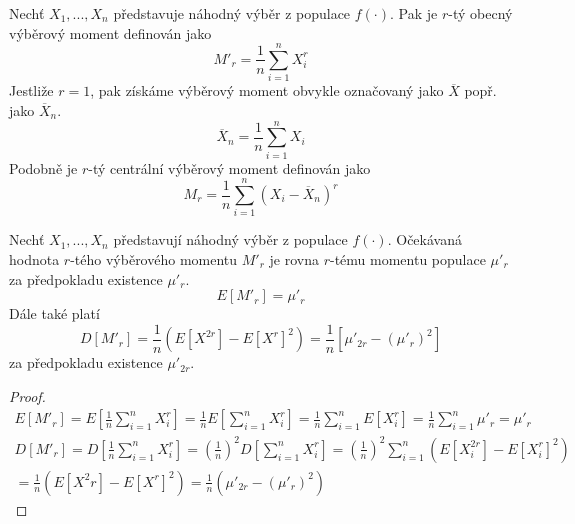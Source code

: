 \begin{definition}
Nechť $X_1, ..., X_n$ představuje náhodný výběr z populace $f(\cdot)$. Pak je $r$-tý obecný výběrový moment definován jako
\begin{equation*}
M'_r = \frac{1}{n} \sum_{i = 1}^n X_i^r
\end{equation*}
Jestliže $r = 1$, pak získáme výběrový moment obvykle označovaný jako $\overline{X}$ popř. jako $\overline{X}_n$.
\begin{equation*}
\overline{X}_n = \frac{1}{n} \sum_{i = 1}^n X_i
\end{equation*}
Podobně je $r$-tý centrální výběrový moment definován jako
\begin{equation*}
M_r = \frac{1}{n} \sum_{i = 1}^n \left(X_i - \overline{X}_n \right)^r
\end{equation*}
\end{definition}

\begin{theorem}
Nechť $X_1, ..., X_n$ představují náhodný výběr z populace $f(\cdot)$. Očekávaná hodnota $r$-tého výběrového momentu $M'_r$ je rovna $r$-tému momentu populace $\mu'_r$ za předpokladu existence $\mu'_r$. 
\begin{equation*}
E[M'_r] = \mu'_r
\end{equation*}
Dále také platí
\begin{equation*}
D[M'_r] = \frac{1}{n}\left(E[X^{2r}] - E[X^r]^2 \right) = \frac{1}{n} [\mu'_{2r} - (\mu'_r)^2]
\end{equation*}
za předpokladu existence $\mu'_{2r}$.
\end{theorem}

\begin{proof}
\begin{gather*}
E[M'_r] = E \left[\frac{1}{n} \sum_{i = 1}^n X_i^r \right] = \frac{1}{n} E \left[\sum_{i = 1}^n X_i^r \right] = \frac{1}{n} \sum_{i = 1}^n E[X_i^r] = \frac{1}{n} \sum_{i = 1}^n \mu'_r = \mu'_r
\end{gather*}
\begin{gather*}
D[M'_r] = D\left[\frac{1}{n} \sum_{i = 1}^n X_i^r \right] = \left(\frac{1}{n} \right)^2 D \left[ \sum_{i = 1}^n X_i^r \right] = \left(\frac{1}{n} \right)^2 \sum_{i = 1}^n \left(E[X_i^{2r}] - E[X_i^r]^2 \right)\\
= \frac{1}{n} \left(E[X^2r] - E[X^r]^2 \right) = \frac{1}{n}\left(\mu'_{2r} - (\mu'_r)^2 \right)
\end{gather*}
\end{proof}

